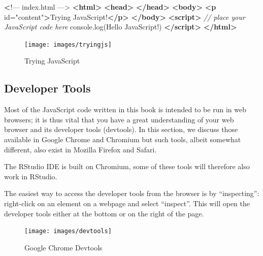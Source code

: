 \documentclass[
  10pt,
]{krantz}
\makeatletter
\newenvironment{Shaded}{\begin{snugshade}}{\end{snugshade}}
\newcommand{\AttributeTok}[1]{\textcolor[rgb]{0.61,0.61,0.61}{#1}}
\newcommand{\CommentTok}[1]{\textcolor[rgb]{0.37,0.37,0.37}{\textit{#1}}}
\newcommand{\ErrorTok}[1]{\textcolor[rgb]{0.14,0.14,0.14}{\textbf{#1}}}
\newcommand{\KeywordTok}[1]{\textcolor[rgb]{0.27,0.27,0.27}{\textbf{#1}}}
\newcommand{\NormalTok}[1]{#1}
\newcommand{\OtherTok}[1]{\textcolor[rgb]{0.37,0.37,0.37}{#1}}
\newcommand{\StringTok}[1]{\textcolor[rgb]{0.5,0.5,0.5}{#1}}
\newcommand{\VariableTok}[1]{\textcolor[rgb]{0,0,0}{#1}}
\newenvironment{kframe}{%
\medskip{}
\setlength{\fboxsep}{.8em}
 \def\at@end@of@kframe{}%
 \ifinner\ifhmode%
  \def\at@end@of@kframe{\end{minipage}}%
  \begin{minipage}{\columnwidth}%
 \fi\fi%
 \def\FrameCommand##1{\hskip\@totalleftmargin \hskip-\fboxsep
 \colorbox{shadecolor}{##1}\hskip-\fboxsep
     \hskip-\linewidth \hskip-\@totalleftmargin \hskip\columnwidth}%
 \MakeFramed {\advance\hsize-\width
   \@totalleftmargin\z@ \linewidth\hsize
   \@setminipage}}%
 {\par\unskip\endMakeFramed%
 \at@end@of@kframe}
\renewenvironment{Shaded}{\begin{kframe}}{\end{kframe}}
\newenvironment{rmdblock}[1]
  {
  \begin{itemize}
  \renewcommand{\labelitemi}{
    \raisebox{-.7\height}[0pt][0pt]{
      {\setkeys{Gin}{width=3em,keepaspectratio}\texttt{[image: images/\#1]}}
    }
  }
  \setlength{\fboxsep}{1em}
  \begin{kframe}
  \item
  }
  {
  \end{kframe}
  \end{itemize}
  }
\newenvironment{rmdnote}
  {\begin{rmdblock}{note}}
  {\end{rmdblock}}
\makeatother
\begin{document}
\begin{Shaded}
\begin{Highlighting}[]
\ErrorTok{<}\NormalTok{!–– index.html ––>}
\KeywordTok{<html>}
  \KeywordTok{<head>}
  \KeywordTok{</head>}
  \KeywordTok{<body>}
    \KeywordTok{<p}\OtherTok{ id=}\StringTok{"content"}\KeywordTok{>}\NormalTok{Trying JavaScript!}\KeywordTok{</p>}
  \KeywordTok{</body>}
  \KeywordTok{<script>}
    \CommentTok{// place your JavaScript code here}
    \VariableTok{console}\NormalTok{.}\AttributeTok{log}\NormalTok{(}\StringTok{\textquotesingle{}Hello JavaScript!\textquotesingle{}}\NormalTok{)}
  \KeywordTok{</script>}
\KeywordTok{</html>}
\end{Highlighting}
\end{Shaded}

\begin{figure}[H]

{\centering \texttt{[image: images/tryingjs]} 

}

\caption{Trying JavaScript}\label{fig:trying-js}
\end{figure}

\hypertarget{basics-chrome-devtools}{%
\subsection{Developer Tools}\label{basics-chrome-devtools}}

Most of the JavaScript code written in this book is intended to be run in web browsers; it is thus vital that you have a great understanding of your web browser and its developer tools (devtools). In this section, we discuss those available in Google Chrome and Chromium but such tools, albeit somewhat different, also exist in Mozilla Firefox and Safari.

\begin{rmdnote}
The RStudio IDE is built on Chromium, some of these tools will therefore
also work in RStudio.
\end{rmdnote}

The easiest way to access the developer tools from the browser is by ``inspecting'': right-click on an element on a webpage and select ``inspect''. This will open the developer tools either at the bottom or on the right of the page.

\begin{figure}[H]

{\centering \texttt{[image: images/devtools]} 

}

\caption{Google Chrome Devtools}\label{fig:chrome-devtools}
\end{figure}
\end{document}
